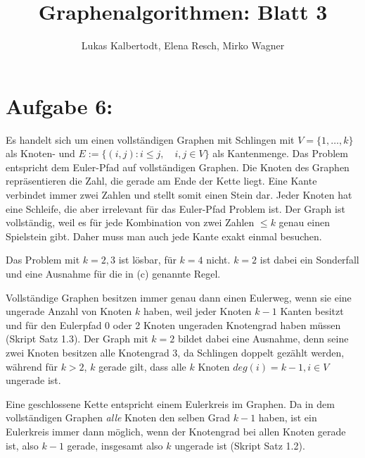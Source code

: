 \documentclass[11pt]{scrartcl} %
\title{Graphenalgorithmen: Blatt 3}
\author{Lukas Kalbertodt, Elena Resch, Mirko Wagner}
\begin{document}
\maketitle
\section*{Aufgabe 6:}
\begin{compactenum}[(a)]
\item Es handelt sich um einen vollständigen Graphen mit Schlingen mit $V = \lbrace {1, \dots ,k} \rbrace $ als Knoten- und $E:= \lbrace (i,j): i \le j, \quad i,j \in V \rbrace$ als Kantenmenge. Das Problem entspricht dem Euler-Pfad auf vollständigen Graphen.
Die Knoten des Graphen repräsentieren die Zahl, die gerade am Ende der Kette liegt. Eine Kante verbindet immer zwei Zahlen und stellt somit einen Stein dar. Jeder Knoten hat eine Schleife, die aber irrelevant für das Euler-Pfad Problem ist. Der Graph ist vollständig, weil es für jede Kombination von zwei Zahlen $\le k$ genau einen Spielstein gibt. Daher muss man auch jede Kante exakt einmal besuchen.
\item Das Problem mit $k=2,3$ ist lösbar, für $k=4$ nicht. $k=2$ ist dabei ein Sonderfall und eine Ausnahme für die in (c) genannte Regel.
\item Vollständige Graphen besitzen immer genau dann einen Eulerweg, wenn sie eine ungerade Anzahl von Knoten $k$ haben, weil jeder Knoten $k-1$ Kanten besitzt und für den Eulerpfad 0 oder 2 Knoten ungeraden Knotengrad haben müssen (Skript Satz 1.3). Der Graph mit $k=2$ bildet dabei eine Ausnahme, denn seine zwei Knoten besitzen alle Knotengrad $3$, da Schlingen doppelt gezählt werden, während für $k > 2$, $k$  gerade gilt, dass alle $k$ Knoten $deg(i) = k-1, i \in V$ ungerade ist.
\item Eine geschlossene Kette entspricht einem Eulerkreis im Graphen. Da in dem vollständigen Graphen \emph{alle} Knoten den selben Grad $k-1$ haben, ist ein Eulerkreis immer dann möglich, wenn der Knotengrad bei allen Knoten gerade ist, also $k-1$ gerade, insgesamt also $k$ ungerade ist (Skript Satz 1.2).
\end{compactenum}
\end{document}
